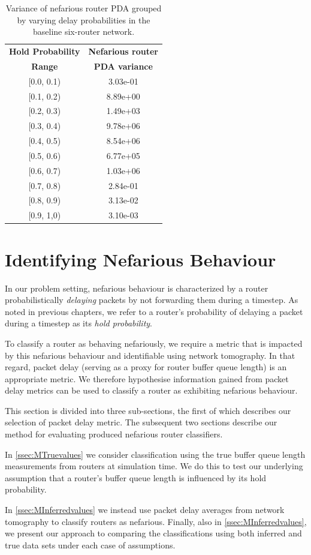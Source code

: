 \begin{table}[t]
 \centering
  \begin{tabular}{@{}cS[table-format=1.2e1]@{}}
   \toprule
    \textbf{Hold Probability} & \textbf{Nefarious router} \\
    \textbf{Range} & \textbf{PDA variance} \\
   \midrule
    {[}0.0, 0.1{)} & 3.03e-01  \\
    {[}0.1, 0.2{)} & 8.89e+00  \\
    {[}0.2, 0.3{)} & 1.49e+03  \\
    {[}0.3, 0.4{)} & 9.78e+06  \\
    {[}0.4, 0.5{)} & 8.54e+06  \\
    {[}0.5, 0.6{)} & 6.77e+05  \\
    {[}0.6, 0.7{)} & 1.03e+06  \\
    {[}0.7, 0.8{)} & 2.84e-01  \\
    {[}0.8, 0.9{)} & 3.13e-02  \\
    {[}0.9, 1,0{)} & 3.10e-03  \\
   \bottomrule
  \end{tabular}
  \caption{Variance of nefarious router PDA grouped by varying delay probabilities in the baseline six-router network.}
    \label{tbl:MrouterPDAvars}
\end{table}
\section{Identifying Nefarious Behaviour}
\label{sec:MNefidentification}
In our problem setting, nefarious behaviour is characterized by a router probabilistically \textit{delaying} packets by not forwarding them during a timestep. As noted in previous chapters, we refer to a router's probability of delaying a packet during a timestep as its \textit{hold probability}.\par
To classify a router as behaving nefariously, we require a metric that is impacted by this nefarious behaviour and identifiable using network tomography. In that regard, packet delay (serving as a proxy for router buffer queue length) is an appropriate metric. We therefore hypothesise information gained from packet delay metrics can be used to classify a router as exhibiting nefarious behaviour.\par
This section is divided into three sub-sections, the first of which describes our selection of packet delay metric. The subsequent two sections describe our method for evaluating produced nefarious router classifiers.\par
In \cref{ssec:MTruevalues} we consider classification using the true buffer queue length measurements from routers at simulation time. We do this to test our underlying assumption that a router's buffer queue length is influenced by its hold probability.\par
In \cref{ssec:MInferredvalues} we instead use packet delay averages from network tomography to classify routers as nefarious. Finally, also in \cref{ssec:MInferredvalues}, we present our approach to comparing the classifications using both inferred and true data sets under each case of assumptions.
  
